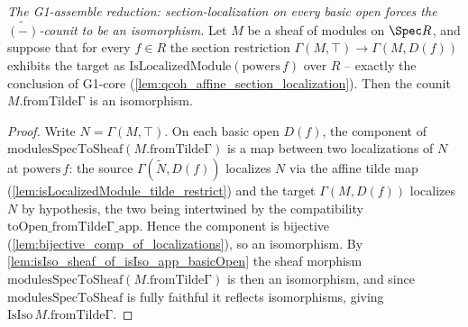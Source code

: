 \begin{lemma}
  \label{lem:isIso_fromTildeΓ_of_isLocalizedModule_restrict}
  \textit{The G1-assemble reduction: section-localization on every basic open forces the
  \(\widetilde{(-)}\)-counit to be an isomorphism.}
  Let \(M\) be a sheaf of modules on \(\Spec R\), and suppose that for every \(f \in R\) the section
  restriction \(\Gamma(M, \top) \to \Gamma(M, D(f))\) exhibits the target as
  \(\mathrm{IsLocalizedModule}(\mathrm{powers}\,f)\) over \(R\) -- exactly the conclusion of G1-core
  (\cref{lem:qcoh_affine_section_localization}). Then the counit \(M.\mathrm{fromTildeΓ}\) is an
  isomorphism.
\end{lemma}
\begin{proof}
  Write \(N = \Gamma(M, \top)\). On each basic open \(D(f)\), the component of
  \(\mathrm{modulesSpecToSheaf}(M.\mathrm{fromTildeΓ})\) is a map between two localizations of \(N\)
  at \(\mathrm{powers}\,f\): the source \(\Gamma(\widetilde N, D(f))\) localizes \(N\) via the affine
  tilde map (\cref{lem:isLocalizedModule_tilde_restrict}) and the target \(\Gamma(M, D(f))\)
  localizes \(N\) by hypothesis, the two being intertwined by the compatibility
  \(\mathrm{toOpen\_fromTildeΓ\_app}\). Hence the component is bijective
  (\cref{lem:bijective_comp_of_localizations}), so an isomorphism. By
  \cref{lem:isIso_sheaf_of_isIso_app_basicOpen} the sheaf morphism
  \(\mathrm{modulesSpecToSheaf}(M.\mathrm{fromTildeΓ})\) is then an isomorphism, and since
  \(\mathrm{modulesSpecToSheaf}\) is fully faithful it reflects isomorphisms, giving
  \(\mathrm{IsIso}\,M.\mathrm{fromTildeΓ}\).
\end{proof}

